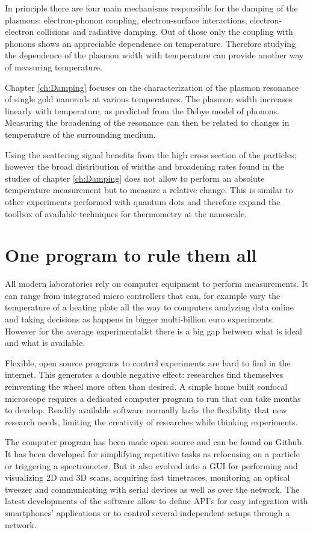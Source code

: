 In principle there are four main mechanisms responsible for the damping of
the plasmons: electron-phonon coupling, electron-surface interactions,
electron-electron collisions and radiative damping. Out of those only the
coupling with phonons shows an appreciable dependence on temperature. Therefore
studying the dependence of the plasmon width with temperature can provide
another way of measuring temperature.

Chapter \ref{ch:Damping} focuses on the characterization of the plasmon
resonance of single gold nanorods at various temperatures. The plasmon width
increases linearly with temperature, as predicted from the Debye model of
phonons. Measuring the broadening of the resonance can then be related to
changes in temperature of the surrounding medium. 

Using the scattering signal benefits from the high cross section of the
particles; however the broad distribution of widths and broadening rates found
in the studies of chapter \ref{ch:Damping} does not allow to perform an absolute
temperature measurement but to measure a relative change. This is similar to
other experiments performed with quantum dots and therefore expand the toolbox
of available techniques for thermometry at the nanoscale. 

\section{One program to rule them all}
All modern laboratories rely on computer equipment to perform measurements. It
can range from integrated micro controllers that can, for example vary the
temperature of a heating plate all the way to computers analyzing data online
and taking decisions as happens in bigger multi-billion euro experiments.
However for the average experimentalist there is a big gap between what is ideal
and what is available. 

Flexible, open source programs to control experiments are hard to find in the
internet. This generates a double negative effect: researches find themselves
reinventing the wheel more often than desired. A simple home built confocal
microscope requires a dedicated computer program to run that can take months to
develop. Readily available software normally lacks the flexibility that new
research needs, limiting the creativity of researches while thinking
experiments. 

The computer program has been made open source and can be found on Github. It
has been developed for simplifying repetitive tasks as refocusing on a particle
or triggering a spectrometer. But it also evolved into a GUI for performing and
visualizing $2$D and $3$D scans, acquiring fast timetraces, monitoring an
optical tweezer and communicating with serial devices as well as over the
network. The latest developments of the software allow to define API's for easy
integration with smartphones' applications or to control several independent
setups through a network.

